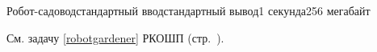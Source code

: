\begin{problem}[(Парников В.\,В.)]{Робот-садовод}{стандартный ввод}{стандартный вывод}{1 секунда}{256 мегабайт}

См. задачу \ref{robotgardener} РКОШП (стр.~\pageref{robotgardener}).

\end{problem}

